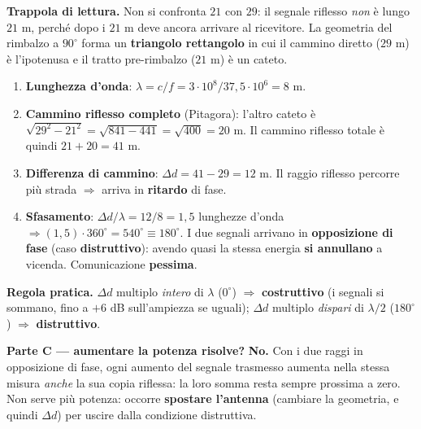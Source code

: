 \documentclass[11pt,a4paper]{report}
\begin{document}
\medskip
\textbf{Trappola di lettura.} Non si confronta $21$ con $29$: il segnale riflesso
\emph{non} è lungo $21$ m, perché dopo i $21$ m deve ancora arrivare al
ricevitore. La geometria del rimbalzo a $90^\circ$ forma un \textbf{triangolo
rettangolo} in cui il cammino diretto ($29$ m) è l'ipotenusa e il tratto
pre-rimbalzo ($21$ m) è un cateto.

\begin{enumerate}[noitemsep]
\item \textbf{Lunghezza d'onda}: $\lambda=c/f=3\cdot10^8/37{,}5\cdot10^6=8$ m.
\item \textbf{Cammino riflesso completo} (Pitagora): l'altro cateto è
$\sqrt{29^2-21^2}=\sqrt{841-441}=\sqrt{400}=20$ m. Il cammino riflesso totale è
quindi $21+20=41$ m.
\item \textbf{Differenza di cammino}: $\Delta d=41-29=12$ m. Il raggio riflesso
percorre più strada $\Rightarrow$ arriva in \textbf{ritardo} di fase.
\item \textbf{Sfasamento}: $\Delta d/\lambda=12/8=1{,}5$ lunghezze d'onda
$\Rightarrow (1{,}5)\cdot360^\circ=540^\circ\equiv 180^\circ$. I due segnali
arrivano in \textbf{opposizione di fase} (caso \textbf{distruttivo}): avendo
quasi la stessa energia \textbf{si annullano} a vicenda. Comunicazione
\textbf{pessima}.
\end{enumerate}

\textbf{Regola pratica.} $\Delta d$ multiplo \emph{intero} di $\lambda$
($0^\circ$) $\Rightarrow$ \textbf{costruttivo} (i segnali si sommano, fino a
$+6$ dB sull'ampiezza se uguali); $\Delta d$ multiplo \emph{dispari} di
$\lambda/2$ ($180^\circ$) $\Rightarrow$ \textbf{distruttivo}.

\medskip
\textbf{Parte C --- aumentare la potenza risolve?} \textbf{No.} Con i due raggi
in opposizione di fase, ogni aumento del segnale trasmesso aumenta nella stessa
misura \emph{anche} la sua copia riflessa: la loro somma resta sempre prossima a
zero. Non serve più potenza: occorre \textbf{spostare l'antenna} (cambiare la
geometria, e quindi $\Delta d$) per uscire dalla condizione distruttiva.
\end{document}
